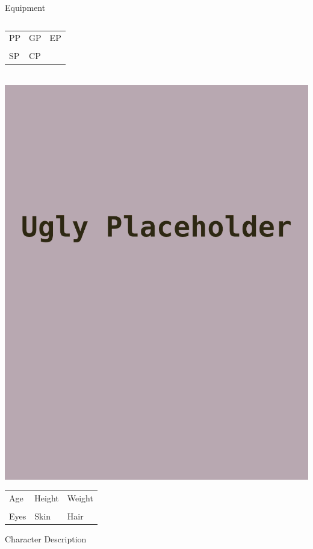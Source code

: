 \documentclass[a4paper,10pt,bg=full]{dndbook} %
\def\Age{}
\def\Height{}
\def\Weight{}
\def\Skin{}
\def\Eyes{}
\def\Hair{}
\def\Description{
}
\def\Equipment{
	\begin{tabularx}{\textwidth}{lX}
	\end{tabularx}
}
\begin{document}
	\begin{minipage}[t][\textheight]{.5\linewidth}\normalsize
		{\LARGE Equipment}\\
		\Equipment
	\end{minipage}%
	\begin{minipage}[t][\textheight]{.5\linewidth}\normalsize
		\begin{tabularx}{\textwidth}{XXX}
			&&\\\hline
			\tiny{PP}&\tiny{GP}	&\tiny{EP}\\
			&&\\\hline
			\tiny{SP}& \tiny{CP}&
		\end{tabularx}\vspace*{.25cm}\\
		\includegraphics[width=\linewidth]{Character.png}\vspace*{.25cm}\\
		\begin{tabularx}{\textwidth}{XXX}
			\Age &\Height &\Weight\\\hline
			\tiny{Age}	& \tiny{Height}	&\tiny{Weight}\\
			\Eyes &\Skin &\Hair\\\hline
			\tiny{Eyes}	& \tiny{Skin}	&\tiny{Hair}\\
		\end{tabularx}
		{\LARGE Character Description}\\
		{\scriptsize\Description}
	\end{minipage} %
\end{document}
